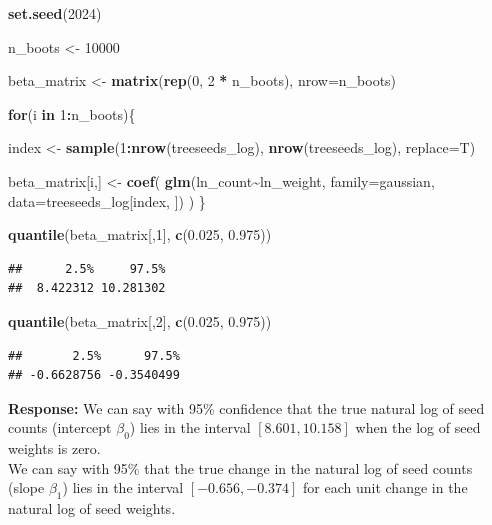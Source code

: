 \documentclass[
]{article}
\newenvironment{Shaded}{\begin{snugshade}}{\end{snugshade}}
\newcommand{\AttributeTok}[1]{\textcolor[rgb]{0.13,0.29,0.53}{#1}}
\newcommand{\ControlFlowTok}[1]{\textcolor[rgb]{0.13,0.29,0.53}{\textbf{#1}}}
\newcommand{\DecValTok}[1]{\textcolor[rgb]{0.00,0.00,0.81}{#1}}
\newcommand{\FloatTok}[1]{\textcolor[rgb]{0.00,0.00,0.81}{#1}}
\newcommand{\FunctionTok}[1]{\textcolor[rgb]{0.13,0.29,0.53}{\textbf{#1}}}
\newcommand{\NormalTok}[1]{#1}
\newcommand{\OtherTok}[1]{\textcolor[rgb]{0.56,0.35,0.01}{#1}}
\newcommand{\SpecialCharTok}[1]{\textcolor[rgb]{0.81,0.36,0.00}{\textbf{#1}}}
\begin{document}
\begin{Shaded}
\begin{Highlighting}[]
\FunctionTok{set.seed}\NormalTok{(}\DecValTok{2024}\NormalTok{)}

\NormalTok{n\_boots }\OtherTok{\textless{}{-}} \DecValTok{10000}

\NormalTok{beta\_matrix }\OtherTok{\textless{}{-}} \FunctionTok{matrix}\NormalTok{(}\FunctionTok{rep}\NormalTok{(}\DecValTok{0}\NormalTok{, }\DecValTok{2} \SpecialCharTok{*}\NormalTok{ n\_boots), }\AttributeTok{nrow=}\NormalTok{n\_boots)}

\ControlFlowTok{for}\NormalTok{(i }\ControlFlowTok{in} \DecValTok{1}\SpecialCharTok{:}\NormalTok{n\_boots)\{}
  
\NormalTok{  index }\OtherTok{\textless{}{-}} \FunctionTok{sample}\NormalTok{(}\DecValTok{1}\SpecialCharTok{:}\FunctionTok{nrow}\NormalTok{(treeseeds\_log), }\FunctionTok{nrow}\NormalTok{(treeseeds\_log), }\AttributeTok{replace=}\NormalTok{T)}
  
\NormalTok{  beta\_matrix[i,] }\OtherTok{\textless{}{-}} \FunctionTok{coef}\NormalTok{(}
    \FunctionTok{glm}\NormalTok{(ln\_count}\SpecialCharTok{\textasciitilde{}}\NormalTok{ln\_weight, }\AttributeTok{family=}\NormalTok{gaussian, }\AttributeTok{data=}\NormalTok{treeseeds\_log[index, ])}
\NormalTok{  )}
\NormalTok{\}}


\FunctionTok{quantile}\NormalTok{(beta\_matrix[,}\DecValTok{1}\NormalTok{], }\FunctionTok{c}\NormalTok{(}\FloatTok{0.025}\NormalTok{, }\FloatTok{0.975}\NormalTok{))}
\end{Highlighting}
\end{Shaded}

\begin{verbatim}
##      2.5%     97.5% 
##  8.422312 10.281302
\end{verbatim}

\begin{Shaded}
\begin{Highlighting}[]
\FunctionTok{quantile}\NormalTok{(beta\_matrix[,}\DecValTok{2}\NormalTok{], }\FunctionTok{c}\NormalTok{(}\FloatTok{0.025}\NormalTok{, }\FloatTok{0.975}\NormalTok{))}
\end{Highlighting}
\end{Shaded}

\begin{verbatim}
##       2.5%      97.5% 
## -0.6628756 -0.3540499
\end{verbatim}

\textbf{Response:} We can say with 95\% confidence that the true natural
log of seed counts (intercept \(\beta_0\)) lies in the interval
\([8.601,10.158]\) when the log of seed weights is zero.\\
We can say with 95\% that the true change in the natural log of seed
counts (slope \(\beta_1\)) lies in the interval \([-0.656, -0.374]\) for
each unit change in the natural log of seed weights.
\end{document}
